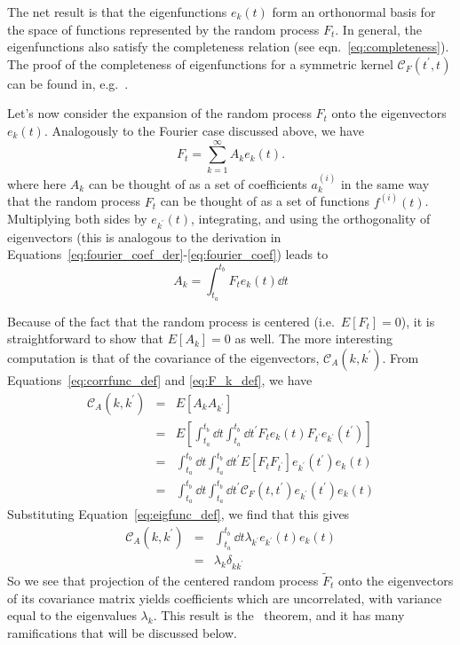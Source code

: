 The net result is that the eigenfunctions $e_k(t)$ form an orthonormal
basis for the space of functions represented by the random process $F_t$.
In general, the eigenfunctions
also satisfy the completeness relation (see eqn.~\ref{eq:completeness}).
The proof of the completeness of eigenfunctions for a symmetric kernel
$\mathcal{C}_F(t^\prime, t)$ can be found in, e.g.~\citet{Courant1989}.

Let's now consider the expansion of the random process $F_t$ onto the
eigenvectors $e_k(t)$.  Analogously to the Fourier case discussed
above, we have
\begin{equation}
  \label{eq:Ft_decomp}
  F_t = \sum_{k=1}^\infty A_k e_k(t).
\end{equation}
where here $A_k$ can be thought of as a set of coefficients $a_k^{(i)}$
in the same way that the random process $F_t$ can be thought of as a
set of functions $f^{(i)}(t)$.
Multiplying both sides by $e_{k^\prime}(t)$, integrating, and using the
orthogonality of eigenvectors (this is analogous to the derivation
in Equations~\ref{eq:fourier_coef_der}-\ref{eq:fourier_coef}) leads to
\begin{equation}
  \label{eq:F_k_def}
  A_k = \int_{t_a}^{t_b} F_t e_k(t) \dd t
\end{equation}

Because of the fact that the random process is centered (i.e.~$E[F_t] = 0$),
it is straightforward to show that $E[A_k] = 0$ as well.  The more interesting
computation is that of the covariance of the eigenvectors,
$\mathcal{C}_A(k, k^\prime)$.
From Equations~\ref{eq:corrfunc_def} and \ref{eq:F_k_def}, we have
\begin{eqnarray}
  \mathcal{C}_A(k, k^\prime)
  &=& E[A_k A_{k^\prime}]\nonumber\\
  &=& E\left[\int_{t_a}^{t_b} \dd t \int_{t_a}^{t_b} \dd t^\prime
    {F}_t e_k(t)
    {F}_{t^\prime} e_{k^\prime}(t^\prime)\right] \nonumber\\
  &=& \int_{t_a}^{t_b} \dd t \int_{t_a}^{t_b} \dd t^\prime
    E[{F}_t {F}_{t^\prime}]
    e_{k^\prime}(t^\prime) e_k(t) \nonumber\\
  &=& \int_{t_a}^{t_b} \dd t \int_{t_a}^{t_b} \dd t^\prime
    \mathcal{C}_F(t, t^\prime)
    e_{k^\prime}(t^\prime) e_k(t) \nonumber
\end{eqnarray}
Substituting Equation~\ref{eq:eigfunc_def}, we find that this gives
\begin{eqnarray}
  \label{eq:cov_A}
  \mathcal{C}_A(k, k^\prime)
  &=& \int_{t_a}^{t_b} \dd t \lambda_{k^\prime} e_{k^\prime}(t) e_k(t) \nonumber\\
  &=& \lambda_k \delta_{kk^\prime}
\end{eqnarray}
So we see that projection of the centered random process $\tilde{F}_t$ onto
the eigenvectors of its covariance matrix yields coefficients which
are uncorrelated, with variance equal to the eigenvalues $\lambda_k$.
This result is the \KL\ theorem, and it has many ramifications that will
be discussed below.

